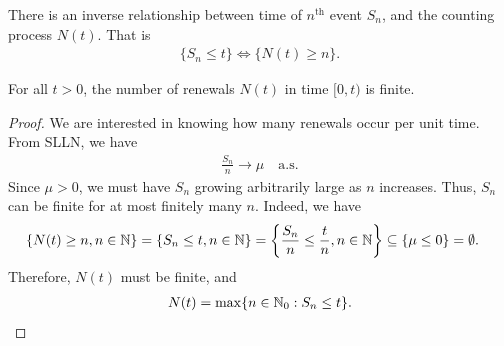 \documentclass[a4paper,10pt, english]{article}
\begin{document}
\begin{lem}
	There is an inverse relationship between time of $n^{\text{th}}$ event $S_n$, and the counting process $N(t)$. That is
	\begin{align}
	\label{eq:InverseRelationship}
	\{S_n \leq t\} \iff \{N(t) \geq n\}.
	\end{align}
\end{lem}

\begin{lem}[Finiteness of $N(t)$]
For all $t > 0$, the number of renewals $N(t)$ in time $[0,t)$ is finite. 
\end{lem}
\begin{proof}
We are interested in knowing how many renewals occur per unit time. From SLLN, we have 
	\begin{align*} 
	\frac{S_n}{n} \to \mu \quad \mbox{a.s.}
	\end{align*}
Since $\mu > 0$, we must have $S_n$ growing arbitrarily large as $n$ increases. 
Thus, $S_n$ can be finite for at most finitely many $n$. 
Indeed, we have
\begin{align*}
\{N(t) \geq n, n \in \mathbb{N}\} &= \{S_n \leq t, n \in \mathbb{N}\} = \left\{\frac{S_n}{n} \leq \frac{t}{n}, n \in \mathbb{N} \right\} \subseteq\{\mu \leq 0\} = \emptyset. 
\end{align*}
Therefore, $N(t)$ must be finite, and
	\begin{align*} 
	N(t) = \max\{n \in \mathbb{N}_0 : S_n \leq t\}.
	\end{align*} 
\end{proof}
\end{document}
